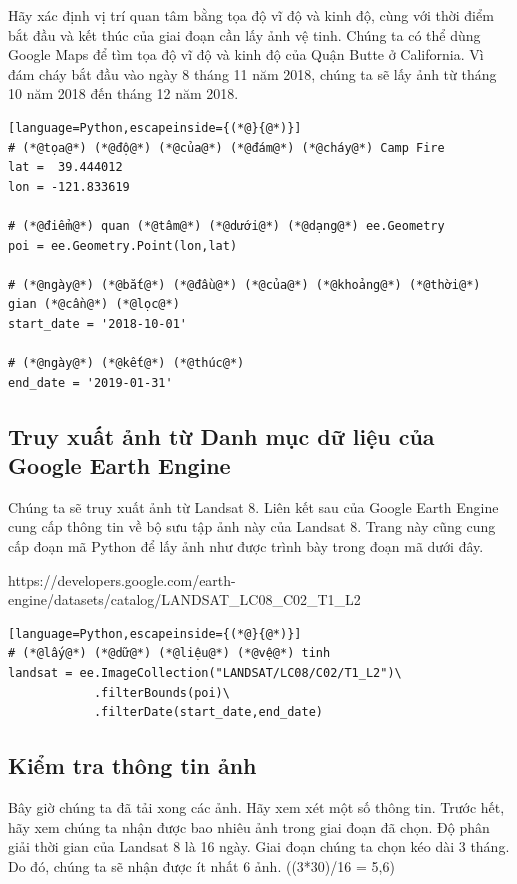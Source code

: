 Hãy xác định vị trí quan tâm bằng tọa độ vĩ độ và kinh độ, cùng với thời điểm bắt đầu và kết thúc của giai đoạn cần lấy ảnh vệ tinh. Chúng ta có thể dùng Google Maps để tìm tọa độ vĩ độ và kinh độ của Quận Butte ở California. Vì đám cháy bắt đầu vào ngày 8 tháng 11 năm 2018, chúng ta sẽ lấy ảnh từ tháng 10 năm 2018 đến tháng 12 năm 2018.

\begin{lstlisting}[language=Python,escapeinside={(*@}{@*)}]
# (*@tọa@*) (*@độ@*) (*@của@*) (*@đám@*) (*@cháy@*) Camp Fire
lat =  39.444012
lon = -121.833619

# (*@điểm@*) quan (*@tâm@*) (*@dưới@*) (*@dạng@*) ee.Geometry
poi = ee.Geometry.Point(lon,lat)

# (*@ngày@*) (*@bắt@*) (*@đầu@*) (*@của@*) (*@khoảng@*) (*@thời@*) gian (*@cần@*) (*@lọc@*)
start_date = '2018-10-01'

# (*@ngày@*) (*@kết@*) (*@thúc@*)
end_date = '2019-01-31'
\end{lstlisting}

\subsection{Truy xuất ảnh từ Danh mục dữ liệu của Google Earth Engine}

Chúng ta sẽ truy xuất ảnh từ Landsat 8. Liên kết sau của Google Earth Engine cung cấp thông tin về bộ sưu tập ảnh này của Landsat 8. Trang này cũng cung cấp đoạn mã Python để lấy ảnh như được trình bày trong đoạn mã dưới đây.

https://developers.google.com/earth-engine/datasets/catalog/LANDSAT\_LC08\_C02\_T1\_L2

\begin{lstlisting}[language=Python,escapeinside={(*@}{@*)}]
# (*@lấy@*) (*@dữ@*) (*@liệu@*) (*@vệ@*) tinh
landsat = ee.ImageCollection("LANDSAT/LC08/C02/T1_L2")\
            .filterBounds(poi)\
            .filterDate(start_date,end_date)
\end{lstlisting}

\subsection{Kiểm tra thông tin ảnh}

Bây giờ chúng ta đã tải xong các ảnh. Hãy xem xét một số thông tin. Trước hết, hãy xem chúng ta nhận được bao nhiêu ảnh trong giai đoạn đã chọn. Độ phân giải thời gian của Landsat 8 là 16 ngày. Giai đoạn chúng ta chọn kéo dài 3 tháng. Do đó, chúng ta sẽ nhận được ít nhất 6 ảnh. ((3*30)/16 = 5,6)

